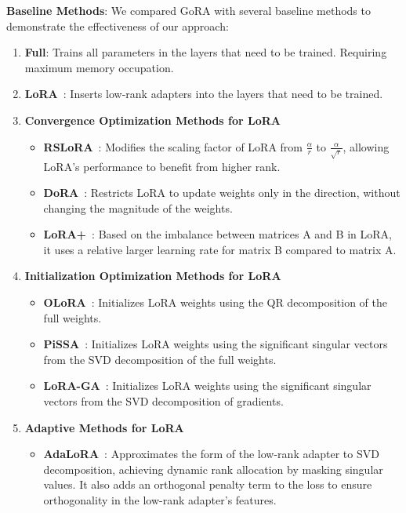 \textbf{Baseline Methods}: We compared GoRA with several baseline methods to demonstrate the effectiveness of our approach:
\begin{enumerate}
    \renewcommand{\labelenumi}{\alph{enumi}.}
    \item \textbf{Full}: Trains all parameters in the layers that need to be trained. Requiring maximum memory occupation.
    
    \item \textbf{LoRA}~\citep{hu2021lora}: Inserts low-rank adapters into the layers that need to be trained. 
    
    \item \textbf{Convergence Optimization Methods for LoRA}
    \begin{itemize}
        \item \textbf{RSLoRA}~\citep{kalajdzievski2023rslora}: Modifies the scaling factor of LoRA from \(\frac{\alpha}{r}\) to \(\frac{\alpha}{\sqrt{r}}\), allowing LoRA's performance to benefit from higher rank.
        \item \textbf{DoRA}~\citep{liu2024dora}: Restricts LoRA to update weights only in the direction, without changing the magnitude of the weights.
        \item \textbf{LoRA+}~\citep{hayou2024lora+}: Based on the imbalance between matrices A and B in LoRA, it uses a relative larger learning rate for matrix B compared to matrix A.
    \end{itemize}

    \item \textbf{Initialization Optimization Methods for LoRA}
    \begin{itemize}
        \item \textbf{OLoRA}~\citep{buyukakyuz2024olora}: Initializes LoRA weights using the QR decomposition of the full weights.
        \item \textbf{PiSSA}~\citep{meng2024pissa}: Initializes LoRA weights using the significant singular vectors from the SVD decomposition of the full weights.
        \item \textbf{LoRA-GA}~\citep{wang2024lora-ga}: Initializes LoRA weights using the significant singular vectors from the SVD decomposition of gradients.
    \end{itemize}
    
    \item \textbf{Adaptive Methods for LoRA}
    \begin{itemize}
        \item \textbf{AdaLoRA}~\citep{zhang2023adalora}: Approximates the form of the low-rank adapter to SVD decomposition, achieving dynamic rank allocation by masking singular values. It also adds an orthogonal penalty term to the loss to ensure orthogonality in the low-rank adapter's features.
    \end{itemize}
\end{enumerate}

